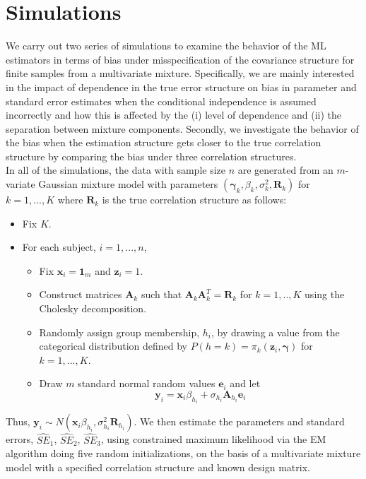 \documentclass[10pt]{article}
\newcommand{\B}[0]{\mathbf}
\newcommand{\bs}[0]{\boldsymbol}
\begin{document}
 \section{Simulations}
We carry out two series of simulations to examine the behavior of the ML estimators in terms of bias under misspecification of the covariance structure for finite samples from a multivariate mixture. Specifically, we are mainly interested in the impact of dependence in the true error structure on bias in parameter and standard error estimates when the conditional independence is assumed incorrectly and how this is affected by the (i) level of dependence and (ii) the separation between mixture components. Secondly, we investigate the behavior of the bias when the estimation structure gets closer to the true correlation structure by comparing the bias under three correlation structures.\\

In all of the simulations, the data with sample size $n$ are generated from an $m$-variate Gaussian mixture model with parameters $(\bs\gamma_{k},\beta_{k},\sigma^{2}_{k},\B R_k)$ for $k=1,...,K$ where $\B R_k$ is the true correlation structure as follows:
\begin{itemize}
\item Fix $K$. 
\item For each subject, $i=1,...,n$, 
\begin{itemize}
\item Fix $\B x_{i} = \B 1_{m}$ and $\B z_{i}=1$.
\item Construct matrices $\B A_k$ such that $\B A_k\B A_k^{T}=\B R_k$ for $k=1,..,K$ using the Cholesky decomposition. 
\item Randomly assign group membership, $h_{i}$, by drawing a value from the categorical distribution defined by $P(h=k)=\pi_{k}(\B z_{i},\bs\gamma)$ for $k=1,...,K$. 
\item Draw $m$ standard normal random values $\B e_{i}$ and let
$$\B y_{i}=\B x_{i}\beta_{h_{i}}+\sigma_{h_{i}}\B A_{h_{i}}\B e_{i}$$
\end{itemize}
\end{itemize}
Thus, $\B y_{i}\sim N(\B x_{i}\beta_{h_{i}},\sigma_{h_{i}}^{2}\B R_{h_{i}})$. We then estimate the parameters and standard errors, $\widehat{SE}_1$, $\widehat{SE}_2$, $\widehat{SE}_3$, using constrained maximum likelihood via the EM algorithm \cite{hathaway1985} doing five random initializations, on the basis of a multivariate mixture model with a specified correlation structure and known design matrix.\\
\end{document}
